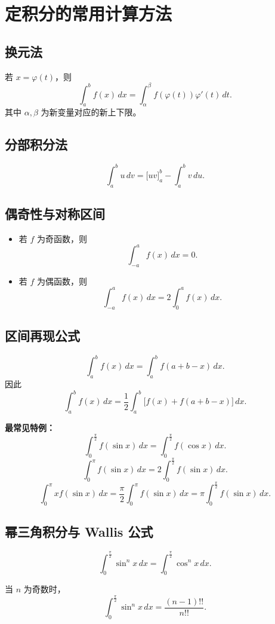 \documentclass[12pt,a4paper]{ctexart}
\begin{document}
\section{定积分的常用计算方法}

\subsection{换元法}
若 $x=\varphi(t)$，则
\[
\int_a^b f(x)\,dx=\int_{\alpha}^{\beta}f(\varphi(t))\varphi'(t)\,dt.
\]
其中 $\alpha,\beta$ 为新变量对应的新上下限。

\subsection{分部积分法}
\[
\int_a^b u\,dv=\Big[uv\Big]_a^b-\int_a^b v\,du.
\]

\subsection{偶奇性与对称区间}
\begin{itemize}
  \item 若 $f$ 为奇函数，则
  \[
  \int_{-a}^a f(x)\,dx=0.
  \]
  \item 若 $f$ 为偶函数，则
  \[
  \int_{-a}^a f(x)\,dx=2\int_0^a f(x)\,dx.
  \]
\end{itemize}

\subsection{区间再现公式}
\[
\int_a^b f(x)\,dx=\int_a^b f(a+b-x)\,dx.
\]
因此
\[
\int_a^b f(x)\,dx=\frac12\int_a^b\bigl[f(x)+f(a+b-x)\bigr]\,dx.
\]

\begin{keybox}
\textbf{最常见特例：}
\[
\int_0^{\frac{\pi}{2}} f(\sin x)\,dx
=
\int_0^{\frac{\pi}{2}} f(\cos x)\,dx.
\]
\[
\int_0^\pi f(\sin x)\,dx
=
2\int_0^{\frac{\pi}{2}} f(\sin x)\,dx.
\]
\[
\int_0^\pi x f(\sin x)\,dx
=
\frac{\pi}{2}\int_0^\pi f(\sin x)\,dx
=
\pi\int_0^{\frac{\pi}{2}} f(\sin x)\,dx.
\]
\end{keybox}

\subsection{幂三角积分与 Wallis 公式}
\[
\int_0^{\frac{\pi}{2}}\sin^n x\,dx
=
\int_0^{\frac{\pi}{2}}\cos^n x\,dx.
\]

当 $n$ 为奇数时，
\[
\int_0^{\frac{\pi}{2}}\sin^n x\,dx
=
\frac{(n-1)!!}{n!!}.
\]
\end{document}
